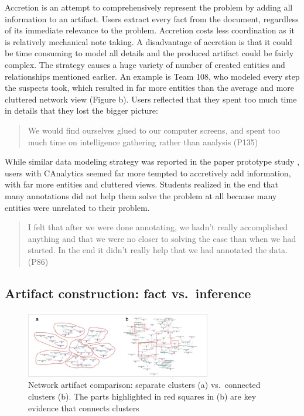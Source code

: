 Accretion is an attempt to comprehensively represent the problem by
adding all information to an artifact. Users extract every fact from the
document, regardless of its immediate relevance to the problem.
Accretion costs less coordination as it is relatively mechanical note
taking. A disadvantage of accretion is that it could be time consuming
to model all details and the produced artifact could be fairly complex.
The strategy causes a huge variety of number of created entities and
relationships mentioned earlier. An example is Team 108, who modeled
every step the suspects took, which resulted in far more entities than
the average and more cluttered network view (Figure
\autocite{fig:network_accretion}b). Users reflected that they spent too
much time in details that they lost the bigger picture:

\begin{quote}
We would find ourselves glued to our computer screens, and spent too
much time on intelligence gathering rather than analysis (P135)
\end{quote}

While similar data modeling strategy was reported in the paper prototype
study \autocite{Carroll2013}, users with CAnalytics seemed far more
tempted to accretively add information, with far more entities and
cluttered views. Students realized in the end that many annotations did
not help them solve the problem at all because many entities were
unrelated to their problem.

\begin{quote}
I felt that after we were done annotating, we hadn't really accomplished
anything and that we were no closer to solving the case than when we had
started. In the end it didn't really help that we had annotated the
data. (P86)
\end{quote}

\subsection{Artifact construction: fact
vs.~inference}\label{artifact-construction-fact-vs.inference}

\begin{figure}
\centering
\includegraphics[width=3.20000in]{img/network_cluster.png}
\caption{Network artifact comparison: separate clusters (a)
vs.~connected clusters (b). The parts highlighted in red squares in (b) are key
evidence that connects clusters\label{fig:network_cluster}}
\end{figure}

